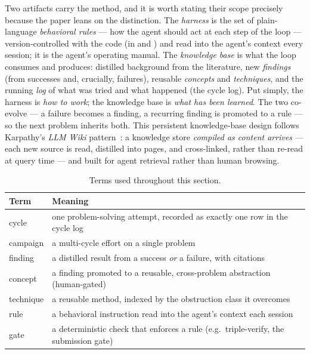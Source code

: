 \documentclass[11pt]{article}
\begin{document}
Two artifacts carry the method, and it is worth stating their scope precisely because the paper
leans on the distinction. The \emph{harness} is the set of plain-language \emph{behavioral rules}
--- how the agent should act at each step of the loop --- version-controlled with the code (in
 and ) and read into the agent's context every session; it
is the agent's operating manual. The \emph{knowledge base} is what the loop consumes and
produces: distilled background from the literature, new \emph{findings} (from successes and,
crucially, failures), reusable \emph{concepts} and \emph{techniques}, and the running
\emph{log} of what was tried and what happened (the cycle log). Put simply, the harness is
\emph{how to work}; the knowledge base is \emph{what has been learned}. The two co-evolve --- a
failure becomes a finding, a recurring finding is promoted to a rule --- so the next problem
inherits both. This persistent knowledge-base design follows Karpathy's \emph{LLM Wiki}
pattern~\cite{karpathy2026llmwiki}: a knowledge store \emph{compiled as content arrives} ---
each new source is read, distilled into pages, and cross-linked, rather than re-read at query
time --- and built for agent retrieval rather than human browsing.

\begin{table}[htbp]
\centering\small
\caption{Terms used throughout this section.}
\label{tab:defs}
\begin{tabularx}{\textwidth}{lX}
\toprule
Term & Meaning \\
\midrule
cycle     & one problem-solving attempt, recorded as exactly one row in the cycle log \\
campaign  & a multi-cycle effort on a single problem \\
finding   & a distilled result from a success \emph{or} a failure, with citations \\
concept   & a finding promoted to a reusable, cross-problem abstraction (human-gated) \\
technique & a reusable method, indexed by the obstruction class it overcomes \\
rule      & a behavioral instruction read into the agent's context each session \\
gate      & a deterministic check that enforces a rule (e.g.\ triple-verify, the submission gate) \\
\bottomrule
\end{tabularx}
\end{table}
\end{document}
